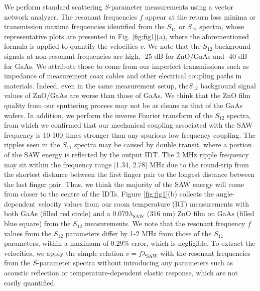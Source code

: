 \documentclass[aps,prb,amsmath,amssymb,footinbib,showpacs,superscriptaddress]{revtex4-1}%
\begin{document}
We perform standard scattering $S$-parameter measurements using a vector network analyzer. 
The resonant frequencies $f$ appear at the return loss minima or transmission maxima frequencies identified from the $S_{11}$ or $S_{12}$ spectra, whose representative plots are presented in Fig. \ref{fig:fig1}(a), where the aforementioned formula is applied to quantify the velocities $v$. We note that the $S_{12}$ background signals at non-resonant frequencies are high, -25 dB for ZnO/GaAs and -40 dB for GaAs. We attribute those to come from our imperfect transmissions such as impedance of measurement coax cables and other electrical coupling paths in materials. Indeed, even in the same measurement setup, the$S_{12}$ background signal values of ZnO/GaAs are worse than those of GaAs. We think that the ZnO film quality from our sputtering process may not be as cleans as that of the GaAs wafers.  In addition, we perform the inverse Fourier transform of the $S_{12}$ spectra, from which we confirmed that our mechanical coupling associated with the SAW frequency is 10-100 times stronger than any spurious low frequency coupling. The ripples seen in the $S_{11}$ spectra may be caused by double transit, where a portion of the SAW energy is reflected by the output IDT. The 2 MHz ripple frequency may sit within the frequency range [1.34, 2.78] MHz due to the round-trip from the shortest distance between the first finger pair to the longest distance between the last finger pair. Thus, we think the majority of the SAW energy will come from closer to the centre of the IDTs.
Figure \ref{fig:fig1}(b) collects the angle-dependent velocity values from our room temperature (RT) measurements with both GaAs (filled red circle) and a 0.079$\lambda_\text{SAW}$ (316 nm) ZnO film on GaAs (filled blue square) from the $S_{12}$ measurements. We note that the resonant frequency $f$ values from the $S_{12}$ parameters differ by 1-2 MHz from those of the $S_{11}$ parameters, within a maximum of 0.29\% error, which is negligible. To extract the velocities, we apply the simple relation $v = f \lambda_\text{SAW}$ with the resonant frequencies from the $S$-parameter spectra without introducing any parameters such as acoustic reflection or temperature-dependent elastic response, which are not easily quantified. 
\end{document}
